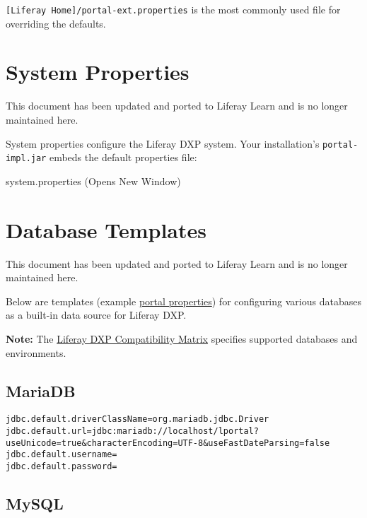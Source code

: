 \texttt{{[}Liferay\ Home{]}/portal-ext.properties} is the most commonly
used file for overriding the defaults.

\chapter{System Properties}\label{system-properties}

{This document has been updated and ported to Liferay Learn and is no
longer maintained here.}

System properties configure the Liferay DXP system. Your installation's
\texttt{portal-impl.jar} embeds the default properties file:

{ system.properties { (Opens New Window)} }

\chapter{Database Templates}\label{database-templates}

{This document has been updated and ported to Liferay Learn and is no
longer maintained here.}

Below are templates (example
\href{/docs/7-2/deploy/-/knowledge_base/d/portal-properties}{portal
properties}) for configuring various databases as a built-in data source
for Liferay DXP.

\noindent\hrulefill

\textbf{Note:} The
\href{https://web.liferay.com/documents/14/21598941/Liferay+DXP+7.2+Compatibility+Matrix/b6e0f064-db31-49b4-8317-a29d1d76abf7?}{Liferay
DXP Compatibility Matrix} specifies supported databases and
environments.

\noindent\hrulefill

\section{MariaDB}\label{mariadb-2}

\begin{verbatim}
jdbc.default.driverClassName=org.mariadb.jdbc.Driver
jdbc.default.url=jdbc:mariadb://localhost/lportal?useUnicode=true&characterEncoding=UTF-8&useFastDateParsing=false
jdbc.default.username=
jdbc.default.password=
\end{verbatim}

\section{MySQL}\label{mysql-2}

